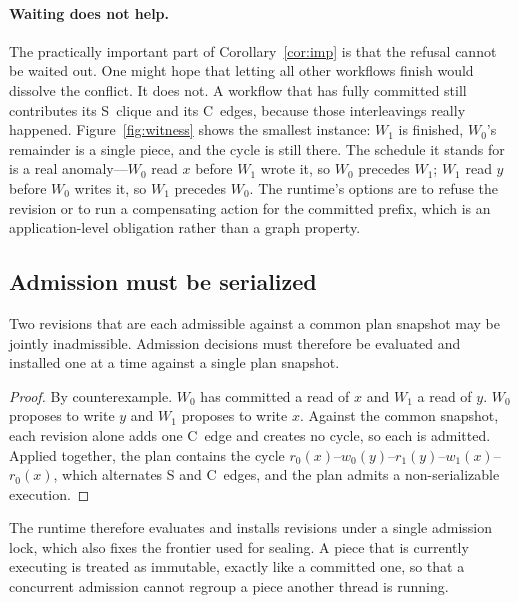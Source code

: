 \paragraph{Waiting does not help.}
The practically important part of Corollary~\ref{cor:imp} is that the refusal
cannot be waited out. One might hope that letting all other workflows finish
would dissolve the conflict. It does not. A workflow that has fully committed
still contributes its S~clique and its C~edges, because those interleavings
really happened. Figure~\ref{fig:witness} shows the smallest instance: $W_1$
is finished, $W_0$'s remainder is a single piece, and the cycle is still
there. The schedule it stands for is a real anomaly---$W_0$ read $x$ before
$W_1$ wrote it, so $W_0$ precedes $W_1$; $W_1$ read $y$ before $W_0$ writes
it, so $W_1$ precedes $W_0$. The runtime's options are to refuse the revision
or to run a compensating action for the committed prefix, which is an
application-level obligation rather than a graph property.

\subsection{Admission must be serialized}

\begin{theorem}
\label{thm:serial}
Two revisions that are each admissible against a common plan snapshot may be
jointly inadmissible. Admission decisions must therefore be evaluated and
installed one at a time against a single plan snapshot.
\end{theorem}

\begin{proof}
By counterexample. $W_0$ has committed a read of $x$ and $W_1$ a read of $y$.
$W_0$ proposes to write $y$ and $W_1$ proposes to write $x$. Against the
common snapshot, each revision alone adds one C~edge and creates no cycle, so
each is admitted. Applied together, the plan contains the cycle
$r_0(x)$--$w_0(y)$--$r_1(y)$--$w_1(x)$--$r_0(x)$, which alternates S and
C~edges, and the plan admits a non-serializable execution.
\end{proof}

The runtime therefore evaluates and installs revisions under a single
admission lock, which also fixes the frontier used for sealing. A piece that
is currently executing is treated as immutable, exactly like a committed one,
so that a concurrent admission cannot regroup a piece another thread is
running.

